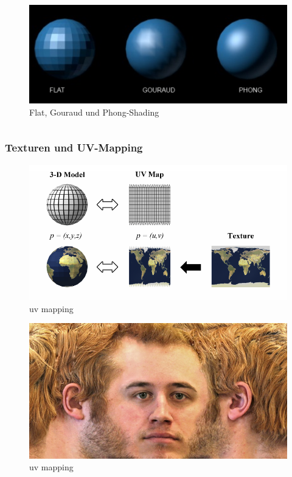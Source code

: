 \begin{figure}[H]
    \centering
    \includegraphics[width=1.0\textwidth]{images/flat_gouraud_phong.jpg}
    \caption{Flat, Gouraud und Phong-Shading}
    \label{fig:shading-flat-phong-models}
\end{figure}
  \begin{lstlisting}
  \end{lstlisting}

\subsubsection{Texturen und UV-Mapping}
\begin{figure}[H]
    \centering
    \includegraphics[width=1.0\textwidth]{images/tm_uv.png}
    \caption{uv mapping} %
    \label{fig:uv-mapping1}
\end{figure}

\begin{figure}[H]
    \centering
    \includegraphics[width=1.0\textwidth]{images/tm_face.jpg}
    \caption{uv mapping} %
    \label{fig:uv-mapping2}
\end{figure}





